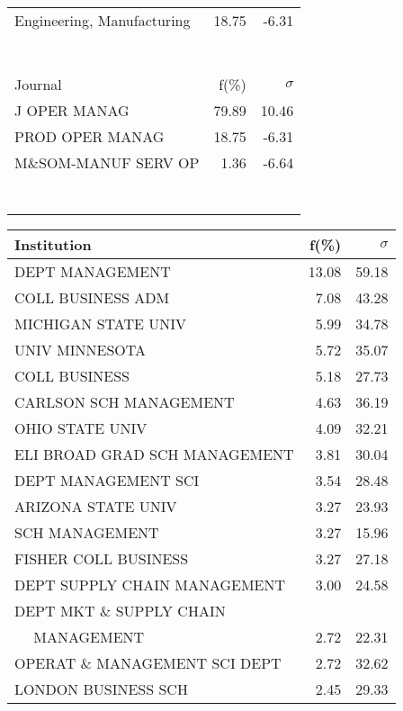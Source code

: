 \documentclass[a4paper,11pt]{report}
\begin{document}
\begin{landscape}
\begin{table}[!ht]
{\begin{tabular}{|l r  r|}
Engineering, Manufacturing & 18.75 & -6.31\\
 &  & \\
 &  & \\
 &  & \\
 &  & \\
 &  & \\
 &  & \\
 &  & \\
\hline
\hline
Journal & f(\%) & $\sigma$\\
\hline
J OPER MANAG & 79.89 & 10.46\\
PROD OPER MANAG & 18.75 & -6.31\\
M\&SOM-MANUF SERV OP & 1.36 & -6.64\\
 &  & \\
 &  & \\
 &  & \\
 &  & \\
 &  & \\
 &  & \\
 &  & \\
\hline
\end{tabular}
}
{\scriptsize\begin{tabular}{|l r r|}
\hline
Institution & f(\%) & $\sigma$\\
\hline
DEPT MANAGEMENT & 13.08 & 59.18\\
COLL BUSINESS ADM & 7.08 & 43.28\\
MICHIGAN STATE UNIV & 5.99 & 34.78\\
UNIV MINNESOTA & 5.72 & 35.07\\
COLL BUSINESS & 5.18 & 27.73\\
CARLSON SCH MANAGEMENT & 4.63 & 36.19\\
OHIO STATE UNIV & 4.09 & 32.21\\
ELI BROAD GRAD SCH MANAGEMENT & 3.81 & 30.04\\
DEPT MANAGEMENT SCI & 3.54 & 28.48\\
ARIZONA STATE UNIV & 3.27 & 23.93\\
SCH MANAGEMENT & 3.27 & 15.96\\
FISHER COLL BUSINESS & 3.27 & 27.18\\
DEPT SUPPLY CHAIN MANAGEMENT & 3.00 & 24.58\\
DEPT MKT \& SUPPLY CHAIN &  & \\
$\quad$ MANAGEMENT & 2.72 & 22.31\\
OPERAT \& MANAGEMENT SCI DEPT & 2.72 & 32.62\\
LONDON BUSINESS SCH & 2.45 & 29.33\\

\end{tabular}}
\end{table}
\end{landscape}
\end{document}

